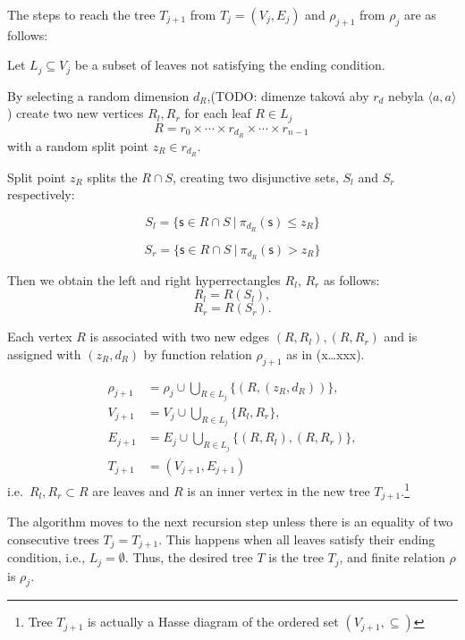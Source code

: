 The steps to reach the tree \(T_{j+1}\) from \(T_{j} = (V_j, E_j)\) and $\rho_{j+1}$ from $\rho_{j}$ are
as follows:

Let \(L_j \subseteq V_j\) be a subset of leaves not satisfying the
ending condition. 

By selecting a random dimension $d_R$,(TODO: dimenze taková aby $r_d$ nebyla $\langle a,a\rangle$)   create two new vertices \(R_l, R_r\) for each leaf \(R \in L_j\)\
\[R =  r_0 \times \cdots \times r_{d_R} \times \cdots \times r_{n-1}  \tag{xx}\,\] with a random split point $z_R \in r_{d_R}$.

Split point $z_R$ splits the $R \cap S$, creating two disjunctive sets, $S_l$ and $S_r$ respectively:

$$S_l = \{ \mathsf{s} \in{R \cap S}\ |\ \pi_{d_R}(\mathsf{s})\le z_R\}$$

$$S_r = \{ \mathsf{s} \in{R \cap S}\ |\ \pi_{d_R}(\mathsf{s}) > z_R\}$$

Then we obtain the left and right hyperrectangles \(R_l\), \(R_r\) as
follows:
$$R_l = R(S_l),$$
$$R_r = R(S_r).$$

Each vertex \(R\) is associated with two new
edges \((R,R_l ), (R, R_r)\) and is assigned with $(z_R,d_R)$ by function relation $\rho_{j+1}$ as in (x\ldots xxx).


\begin{align}
   \rho_{j+1} &= \rho_j \cup \bigcup_{R \in L_j} \{(R, (z_R, d_R))\}, \\
   V_{j+1} &= V_j \cup \bigcup_{R \in L_j} \{R_l, R_r\}, \\
   E_{j+1} &= E_j \cup \bigcup_{R \in L_j} \{(R, R_l), (R,R_r)\},\\
   T_{j+1} &= (V_{j+1}, E_{j+1})
\end{align}
i.e.~${R_l, R_r} \subset R$ are leaves and $R$ is an inner vertex in the new tree
\(T_{j+1}\).\footnote{Tree \(T_{j+1}\) is actually a Hasse diagram of the ordered set
\((V_{j+1},\subseteq)\)}


The algorithm moves to the next recursion step unless there is an equality of two consecutive trees \(T_j = T_{j+1}\). This happens when all leaves satisfy their ending condition, i.e., \(L_j = \emptyset\).
Thus, the desired tree $T$ is the tree $T_j$, and finite relation $\rho$ is $\rho_j$.


